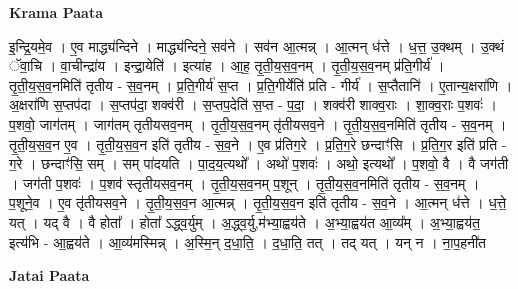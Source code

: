 \documentclass[17pt]{extarticle}
\begin{document}
\textbf{Krama Paata} \newline

इ॒न्द्रि॒यमे॒व । ए॒व माद्ध्य॑न्दिने । माद्ध्य॑न्दिने॒ सव॑ने । सव॑न आ॒त्मन्न् । आ॒त्मन् ध॑त्ते । ध॒त्त॒ उ॒क्थम् । उ॒क्थं ॅवा॒चि । वा॒चीन्द्रा॑य । इन्द्रा॒येति॑ । इत्या॑ह । आ॒ह॒ तृ॒ती॒य॒स॒व॒नम् । तृ॒ती॒य॒स॒व॒नम् प्र॑ति॒गीर्य॑ । तृ॒ती॒य॒स॒व॒नमिति॑ तृतीय - स॒व॒नम् । प्र॒ति॒गीर्य॑ स॒प्त । प्र॒ति॒गीर्येति॑ प्रति - गीर्य॑ । स॒प्तैतानि॑ । ए॒तान्य॒क्षरा॑णि । अ॒क्षरा॑णि स॒प्तप॑दा । स॒प्तप॑दा॒ शक्व॑री । स॒प्तप॒देति॑ स॒प्त - प॒दा॒ । शक्व॑री शाक्व॒राः । शा॒क्व॒राः प॒शवः॑ । प॒शवो॒ जाग॑तम् । जाग॑तम् तृतीयसव॒नम् । तृ॒ती॒य॒स॒व॒नम् तृ॑तीयसव॒ने । तृ॒ती॒य॒स॒व॒नमिति॑ तृतीय - स॒व॒नम् । तृ॒ती॒य॒स॒व॒न ए॒व । तृ॒ती॒य॒स॒व॒न इति॑ तृतीय - स॒व॒ने । ए॒व प्र॑तिग॒रे । प्र॒ति॒ग॒रे छन्दाꣳ॑सि । प्र॒ति॒ग॒र इति॑ प्रति - ग॒रे । छन्दाꣳ॑सि॒ सम् । सम् पा॑दयति । पा॒द॒य॒त्यथो᳚ । अथो॑ प॒शवः॑ । अथो॒ इत्यथो᳚ । प॒शवो॒ वै । वै जग॑ती । जग॑ती प॒शवः॑ । प॒शव॑ स्तृतीयसव॒नम् । तृ॒ती॒य॒स॒व॒नम् प॒शून् । तृ॒ती॒य॒स॒व॒नमिति॑ तृतीय - स॒व॒नम् । प॒शूने॒व । ए॒व तृ॑तीयसव॒ने । तृ॒ती॒य॒स॒व॒न आ॒त्मन्न् । तृ॒ती॒य॒स॒व॒न इति॑ तृतीय - स॒व॒ने । आ॒त्मन् ध॑त्ते । ध॒त्ते॒ यत् । यद् वै । वै होता᳚ । होता᳚ ऽद्ध्व॒र्युम् । अ॒द्ध्व॒र्यु,म॑भ्या॒ह्वय॑ते । अ॒भ्या॒ह्वय॑त आ॒व्य᳚म् । अ॒भ्या॒ह्वय॑त॒ इत्य॑भि - आ॒ह्वय॑ते । आ॒व्य॑मस्मिन्न् । अ॒स्मि॒न् द॒धा॒ति॒ । द॒धा॒ति॒ तत् । तद् यत् । यन् न । ना॒प॒हनी॑त \newline

\textbf{Jatai Paata} \newline
\end{document}
